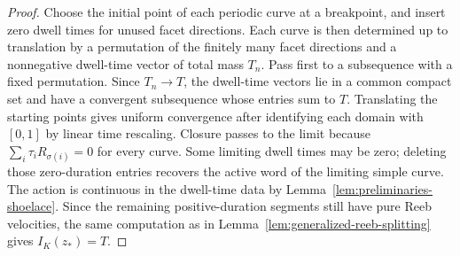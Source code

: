 \begin{proof}
Choose the initial point of each periodic curve at a breakpoint, and insert
zero dwell times for unused facet directions. Each curve is then determined up
to translation by a permutation of the finitely many facet directions and a
nonnegative dwell-time vector of total mass \(T_n\). Pass first to a
subsequence with a fixed permutation. Since \(T_n\to T\), the dwell-time
vectors lie in a common compact set and have a convergent subsequence whose
entries sum to \(T\). Translating the starting points gives uniform convergence
after identifying each domain with \([0,1]\) by linear time rescaling. Closure
passes to the limit because \(\sum_i\tau_iR_{\sigma(i)}=0\) for every curve.
Some limiting dwell times may be zero; deleting those zero-duration entries
recovers the active word of the limiting simple curve. The action is continuous in the dwell-time data by
Lemma~\ref{lem:preliminaries-shoelace}. Since the remaining positive-duration
segments still have pure Reeb velocities, the same computation as in
Lemma~\ref{lem:generalized-reeb-splitting} gives \(I_K(z_*)=T\).
\end{proof}

